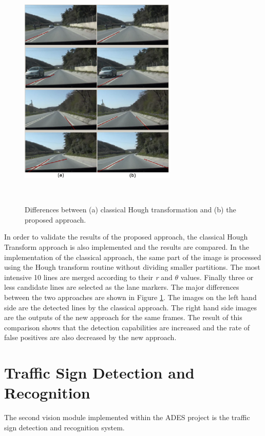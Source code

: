 \documentclass[a4paper,oneside,12pt]{report}
\begin{document}
\begin{figure}[ht]
\begin{center}
\includegraphics[width=75mm,height=115mm]{img/ldfig4.eps}
\caption{Differences between (a) classical Hough transformation and (b) the proposed approach.}
\label{fig:ldfig4}
\end{center}
\end{figure}
\par

In order to validate the results of the proposed approach, the classical Hough Transform approach is also implemented and the results are compared. In the implementation of the classical approach, the same part of the image is processed using the Hough transform routine without dividing smaller partitions. The most intensive 10 lines are merged according to their \textit{r }and \textit{$\theta $} values. Finally three or less candidate lines are selected as the lane markers. The major differences between the two approaches are shown in Figure \ref{fig:ldfig4}. The images on the left hand side are the detected lines by the classical approach. The right hand side images are the outputs of the new approach for the same frames. The result of this comparison shows that the detection capabilities are increased and the rate of false positives are also decreased by the new approach.

\section{Traffic Sign Detection and Recognition}
The second vision module implemented within the ADES project is the traffic sign detection and recognition system. 
\end{document}
